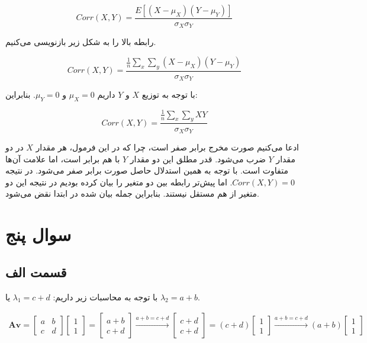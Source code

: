 \documentclass[14pt,a4]{article}
\begin{document}
\begin{enumerate}[label=\alph* )]
    $$Corr(X,Y) = \frac{E[(X-\mu_X)(Y-\mu_Y)]}{\sigma_X\sigma_Y}$$

    رابطه بالا را به شکل زیر بازنویسی می‌کنیم.

    $$Corr(X,Y) = \frac{\frac{1}{n}\sum_{x}\sum_{y} (X-\mu_X)(Y-\mu_Y)}{\sigma_X\sigma_Y}$$

    با توجه به توزیع $X$ و $Y$ داریم $\mu_X=0$ و $\mu_Y=0$. بنابراین:

    $$Corr(X,Y) = \frac{\frac{1}{n}\sum_{x}\sum_{y} XY}{\sigma_X\sigma_Y}$$

    ادعا می‌کنیم صورت مخرج برابر صفر است، چرا که در این فرمول، هر مقدار $X$ در دو مقدار $Y$ ضرب می‌شود.
    قدر مطلق این دو مقدار $Y$ با هم برابر است، اما علامت آن‌ها متفاوت است. با توجه به همین استدلال
    حاصل صورت برابر صفر می‌شود. در نتیجه $Corr(X,Y) = 0$. اما پیش‌تر رابطه‌ بین دو متغیر را بیان کرده بودیم
    در نتیجه این دو متغیر از هم مستقل نیستند. بنابراین جمله بیان شده در ابتدا نقض می‌شود.
\end{enumerate}

\section*{سوال پنج}

\subsection*{قسمت الف}

با توجه به محاسبات زیر داریم:‌ $\lambda_1 = c+d$ یا $\lambda_2 = a+b$.

\begin{eqnarray*}
    \textbf{Av} =
        \begin{bmatrix}
            a & b \\
            c & d
        \end{bmatrix}
        \begin{bmatrix}
            1 \\
            1
        \end{bmatrix} =
        \begin{bmatrix}
            a + b \\
            c + d
        \end{bmatrix} \xrightarrow[]{a+b=c+d}
        \begin{bmatrix}
            c + d \\
            c + d
        \end{bmatrix} = (c+d) \begin{bmatrix}
            1 \\
            1
        \end{bmatrix} \xrightarrow[]{a+b=c+d} (a+b) \begin{bmatrix}
            1 \\
            1
        \end{bmatrix}
\end{eqnarray*}
\end{document}

